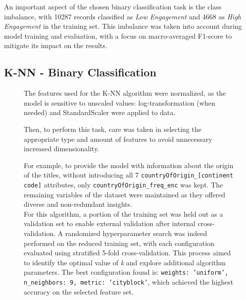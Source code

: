 An important aspect of the chosen binary classification task is the class imbalance, with 10287 records
classified as \textit{Low Engagement} and 4668 as \textit{High Engagement} in the training set.
This imbalance was taken into account during model training and evaluation, with a focus on
macro-averaged F1-score to mitigate its impact on the results.\\

\subsection{K-NN - Binary Classification}
\begin{figure}[H]
    \centering
    \begin{minipage}[t]{0.60\textwidth}
        \vspace{0pt}
        The features used for the K-NN algorithm were normalized, as the model is sensitive to unscaled values: log-transformation (when needed) and StandardScaler were applied to data. 

        Then, to perform this task, care was taken in selecting the appropriate type and amount of features to avoid unnecessary increased dimensionality.
    
        For example, to provide the model with information about the origin of the titles, without introducing all 7 \texttt{countryOfOrigin\_[continent code]} attributes, only \texttt{countryOfOrigin\_freq\_enc} was kept. 
        The remaining variables of the dataset were maintained as they offered diverse and non-redundant insights.\\

       For this algorithm, a portion of the training set was held out as a validation set to enable external validation after internal cross-validation. 
       A randomized hyperparameter search was indeed performed on the reduced training set, with each configuration evaluated using stratified 5-fold cross-validation. 
       This process aimed to identify the optimal value of \textit{k} and explore additional algorithm parameters. 
       The best configuration found is: \texttt{weights: 'uniform', n\_neighbors: 9, metric: 'cityblock'}, which achieved the highest accuracy on the selected feature set.\\


\end{minipage}
\end{figure}

